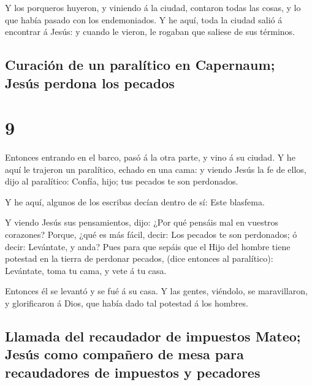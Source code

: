 Y los porqueros huyeron, y viniendo á la ciudad,
contaron todas las cosas, y lo que había pasado con los endemoniados.
 Y he aquí, toda la ciudad salió á encontrar á Jesús: y
cuando le vieron, le rogaban que saliese de sus términos.

\hypertarget{curaciuxf3n-de-un-paraluxedtico-en-capernaum-jesuxfas-perdona-los-pecados}{%
\subsection{Curación de un paralítico en Capernaum; Jesús perdona los
pecados}\label{curaciuxf3n-de-un-paraluxedtico-en-capernaum-jesuxfas-perdona-los-pecados}}

\hypertarget{section-8}{%
\section{9}\label{section-8}}

 Entonces entrando en el barco, pasó á la otra parte, y
vino á su ciudad.  Y he aquí le trajeron un paralítico,
echado en una cama: y viendo Jesús la fe de ellos, dijo al paralítico:
Confía, hijo; tus pecados te son perdonados.

 Y he aquí, algunos de los escribas decían dentro de sí:
Este blasfema.

 Y viendo Jesús sus pensamientos, dijo: ¿Por qué pensáis
mal en vuestros corazones?  Porque, ¿qué es más fácil,
decir: Los pecados te son perdonados; ó decir: Levántate, y anda?
 Pues para que sepáis que el Hijo del hombre tiene
potestad en la tierra de perdonar pecados, (dice entonces al
paralítico): Levántate, toma tu cama, y vete á tu casa.

 Entonces él se levantó y se fué á su casa. 
Y las gentes, viéndolo, se maravillaron, y glorificaron á Dios, que
había dado tal potestad á los hombres.

\hypertarget{llamada-del-recaudador-de-impuestos-mateo-jesuxfas-como-compauxf1ero-de-mesa-para-recaudadores-de-impuestos-y-pecadores}{%
\subsection{Llamada del recaudador de impuestos Mateo; Jesús como
compañero de mesa para recaudadores de impuestos y
pecadores}\label{llamada-del-recaudador-de-impuestos-mateo-jesuxfas-como-compauxf1ero-de-mesa-para-recaudadores-de-impuestos-y-pecadores}}

